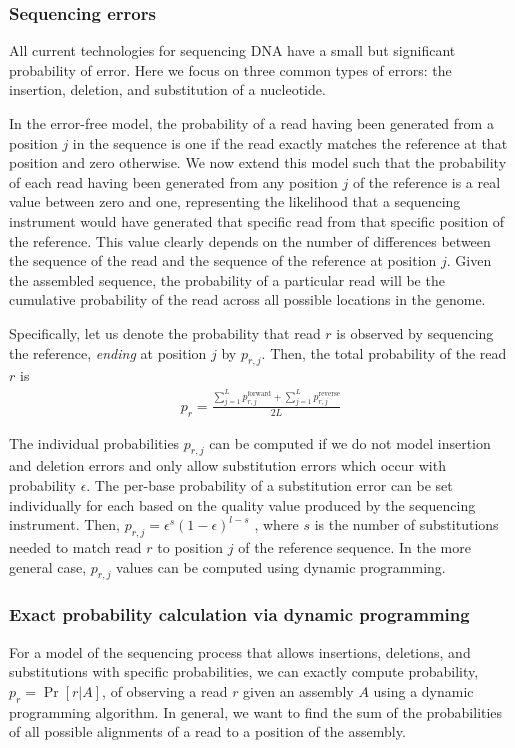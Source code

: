 \documentclass[12pt,\mydriver]{thesis}
\begin{document}
\subsubsection{Sequencing errors}
\label{methods_errors}
All current technologies for sequencing DNA have a small but
significant probability of error.  Here we focus on three common types
of errors: the insertion, deletion, and substitution of a nucleotide.

In the error-free model, the probability of a read having been
generated from a position $j$ in the sequence is one if the read
exactly matches the reference at that position and zero otherwise.  We
now extend this model such that the probability of each read having
been generated from any position $j$ of the reference is a real value
between zero and one, representing the likelihood that a sequencing
instrument would have generated that specific read from that specific
position of the reference.  This value clearly depends on the number of differences
between the sequence of the read and the sequence of the reference at
position $j$.  Given the assembled sequence, the probability of a particular read will be the cumulative probability of the read
across all possible locations in the genome.

Specifically, let us denote the probability that read $r$ is observed
by sequencing the reference, \emph{ending} at position $j$ by
$p_{r,j}$.  Then, the total probability of the read $r$ is
\begin{align}
\label{prob_error_sum}
p_r = \frac{{\sum_{j=1}^{L} p^{\text{forward}}_{r,j}} + {\sum_{j = 1}^{L} p^{\text{reverse}}_{r,j}}}{2L}
\end{align}

The individual probabilities $p_{r,j}$ can be computed if we
do not model insertion and
deletion errors and only allow substitution errors which occur with probability $\epsilon$.  The per-base probability of a substitution error can be set individually for each based on the quality value
produced by the sequencing instrument. Then, $p_{r, j} = \epsilon^{s}(1 - \epsilon)^{l - s}$
, where $s$ is the number of substitutions needed to match read $r$ to
position $j$ of the reference sequence.
In the more general case,
$p_{r,j}$ values can be computed using dynamic programming.

\subsubsection{Exact probability calculation via dynamic programming}
\label{methods_dynamic}
For a model of the sequencing process that allows insertions, deletions,
and substitutions with specific probabilities, we can exactly compute
probability, $p_r = \Pr[r \vert A]$, of observing a read $r$ given an
assembly $A$ using a dynamic programming algorithm.  In general, we
want to find the sum of the probabilities of all possible alignments of a
read to a position of the assembly.
\end{document}
